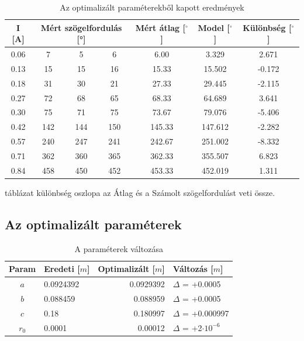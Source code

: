 \documentclass[a4paper, 10pt, oneside]{article}
\begin{document}
\begin{table}[H]
    \centering
    \begin{tabular}{|c|ccc|c|c|c|}
    \hline
        I [A] &  \multicolumn{3}{c|}{Mért szögelfordulás [°]} &  Mért átlag [$^\circ$] &   Model [$^\circ$] & Különbség [$^\circ$]\\ \hline
     0.06 & \multicolumn{1}{c|}{7}   & \multicolumn{1}{c|}{5}   & 6   &   6.00 &   3.329 &  2.671  \\ \hline
     0.13 & \multicolumn{1}{c|}{15}  & \multicolumn{1}{c|}{15}  & 16  &  15.33 &  15.502 & -0.172  \\ \hline
     0.18 & \multicolumn{1}{c|}{31}  & \multicolumn{1}{c|}{30}  & 21  &  27.33 &  29.445 & -2.115  \\ \hline
     0.27 & \multicolumn{1}{c|}{72}  & \multicolumn{1}{c|}{68}  & 65  &  68.33 &  64.689 &  3.641  \\ \hline
     0.30 & \multicolumn{1}{c|}{75}  & \multicolumn{1}{c|}{71}  & 75  &  73.67 &  79.076 & -5.406  \\ \hline
     0.42 & \multicolumn{1}{c|}{142} & \multicolumn{1}{c|}{144} & 150 & 145.33 & 147.612 & -2.282  \\  \hline
     0.57 & \multicolumn{1}{c|}{240} & \multicolumn{1}{c|}{247} & 241 & 242.67 & 251.002 & -8.332 \\ \hline
     0.71 & \multicolumn{1}{c|}{362} & \multicolumn{1}{c|}{360} & 365 & 362.33 & 355.507 &  6.823  \\ \hline
     0.84 & \multicolumn{1}{c|}{458} & \multicolumn{1}{c|}{450} & 452 & 453.33 & 452.019 &  1.311  \\ \hline
    \end{tabular}
    \caption{Az optimalizált paraméterekből kapott eredmények}
	\label{tab:results_new}
\end{table}

 táblázat különbség oszlopa az Átlag és a Számolt szögelfordulást veti össze.


\subsection{Az optimalizált paraméterek}

\begin{table}[H]
    \centering
    \begin{tabular}{|c|l|r|l|}
    \hline
    Param & Eredeti [$m$] &   Optimalizált [$m$] & Változás [$m$]\\ \hline
      $a$ &    0.0924392 &  0.0929392  & $\Delta$ = +0.0005  \\ \hline
      $b$ &    0.088459  &  0.088959   & $\Delta$ = +0.0005 \\ \hline
      $c$ &    0.18      &  0.180997   & $\Delta$ = +0.000997 \\ \hline
      $r_0 $ & 0.0001    &  0.00012    & $\Delta$ = +2$\cdot 10^{-6}$ \\ \hline
    \end{tabular}
    \caption{A paraméterek változása}
    \label{tab:param_delta}
\end{table}
\end{document}
